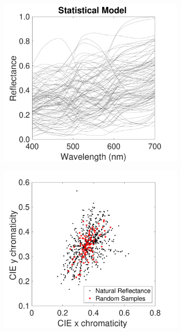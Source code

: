 \documentclass{jov}
\begin{document}
\begin{figure}
\begin{subfigure}{0.24 \textwidth}
        \includegraphics[width=\textwidth]{../FiguresDraft4/Figure7/Figure7_b.pdf}
        \label{fig:reflectanceSamples}
    \end{subfigure}
    \begin{subfigure}{0.24 \textwidth}
    \centering
    \caption{}
        \includegraphics[width=\textwidth]{../FiguresDraft4/Figure7/Figure7_c.pdf}
        \label{fig:xyChroReflectance}

\end{subfigure}
\end{figure}
\end{document}
